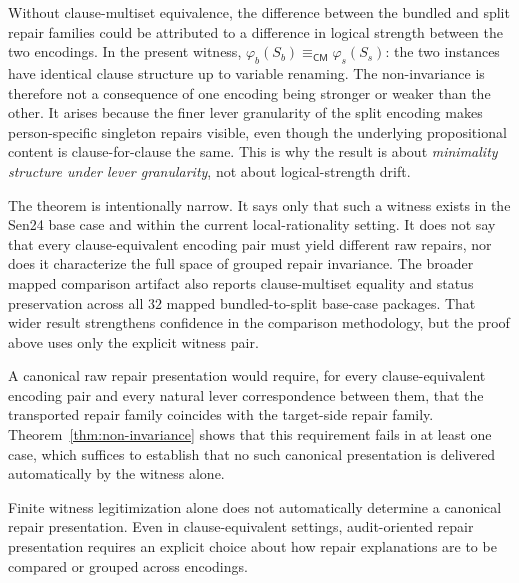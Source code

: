 \begin{remark}
\label{rem:clause-essential}
Without clause-multiset equivalence, the difference between the bundled and split repair families could be attributed to a difference in logical strength between the two encodings.
In the present witness, $\varphi_b(S_b) \equiv_{\mathsf{CM}} \varphi_s(S_s)$: the two instances have identical clause structure up to variable renaming.
The non-invariance is therefore not a consequence of one encoding being stronger or weaker than the other.
It arises because the finer lever granularity of the split encoding makes person-specific singleton repairs visible, even though the underlying propositional content is clause-for-clause the same.
This is why the result is about \emph{minimality structure under lever granularity}, not about logical-strength drift.
\end{remark}

\begin{remark}
\label{rem:interpretation}
The theorem is intentionally narrow.
It says only that such a witness exists in the Sen24 base case and within the current local-rationality setting.
It does not say that every clause-equivalent encoding pair must yield different raw repairs, nor does it characterize the full space of grouped repair invariance.
The broader mapped comparison artifact also reports clause-multiset equality and status preservation across all $32$ mapped bundled-to-split base-case packages.
That wider result strengthens confidence in the comparison methodology, but the proof above uses only the explicit witness pair.
\end{remark}

A canonical raw repair presentation would require, for every clause-equivalent encoding pair and every natural lever correspondence between them, that the transported repair family coincides with the target-side repair family.
Theorem~\ref{thm:non-invariance} shows that this requirement fails in at least one case, which suffices to establish that no such canonical presentation is delivered automatically by the witness alone.

\begin{corollary}
\label{cor:abstraction-contract}
Finite witness legitimization alone does not automatically determine a canonical repair presentation.
Even in clause-equivalent settings, audit-oriented repair presentation requires an explicit choice about how repair explanations are to be compared or grouped across encodings.
\end{corollary}


